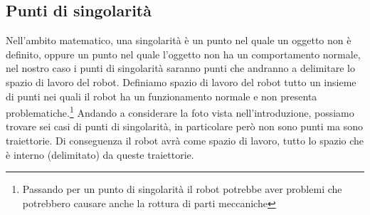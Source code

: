 \subsection{Punti di singolarità}
Nell'ambito matematico, una singolarità è un punto nel quale un oggetto non è definito, oppure un punto nel quale l'oggetto non ha un comportamento normale, nel nostro caso i punti di singolarità saranno punti che andranno a delimitare lo spazio di lavoro del robot. Definiamo spazio di lavoro del robot tutto un insieme di punti nei quali il robot ha un funzionamento normale e non presenta problematiche.\footnote{Passando per un punto di singolarità il robot potrebbe aver problemi che potrebbero causare anche la rottura di parti meccaniche} Andando a considerare la foto vista nell'introduzione, possiamo trovare sei casi di punti di singolarità, in particolare però non sono punti ma sono traiettorie. Di conseguenza il robot avrà come spazio di lavoro, tutto lo spazio che è interno (delimitato) da queste traiettorie.
